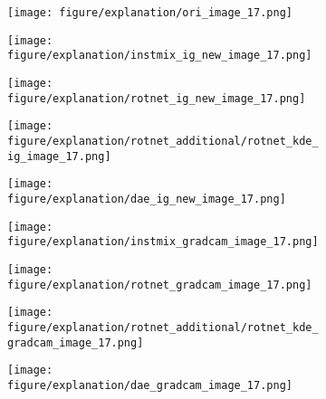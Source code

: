 \documentclass{article} \usepackage{iclr2021_conference,times}
\begin{document}
\begin{figure}[h!]
\centering
\begin{subfigure}{.11\textwidth}
  \centering
  \texttt{[image: figure/explanation/ori\_image\_17.png]}
\end{subfigure}
\hspace{-2mm}
\begin{subfigure}{.11\textwidth}
  \centering
  \texttt{[image: figure/explanation/instmix\_ig\_new\_image\_17.png]}
\end{subfigure}
\hspace{-2mm}
\begin{subfigure}{.11\textwidth}
  \centering
  \texttt{[image: figure/explanation/rotnet\_ig\_new\_image\_17.png]}
\end{subfigure}
\hspace{-2mm}
\begin{subfigure}{.11\textwidth}
  \centering
  \texttt{[image: figure/explanation/rotnet\_additional/rotnet\_kde\_ig\_image\_17.png]}
\end{subfigure}
\hspace{-2mm}
\begin{subfigure}{.11\textwidth}
  \centering
  \texttt{[image: figure/explanation/dae\_ig\_new\_image\_17.png]}
\end{subfigure}
\hspace{-2mm}
\begin{subfigure}{.11\textwidth}
  \centering
  \texttt{[image: figure/explanation/instmix\_gradcam\_image\_17.png]}
\end{subfigure}
\hspace{-2mm}
\begin{subfigure}{.11\textwidth}
  \centering
  \texttt{[image: figure/explanation/rotnet\_gradcam\_image\_17.png]}
\end{subfigure}
\hspace{-2mm}
\begin{subfigure}{.11\textwidth}
  \centering
  \texttt{[image: figure/explanation/rotnet\_additional/rotnet\_kde\_gradcam\_image\_17.png]}
\end{subfigure}
\hspace{-2mm}
\begin{subfigure}{.11\textwidth}
  \centering
  \texttt{[image: figure/explanation/dae\_gradcam\_image\_17.png]}
\end{subfigure}\\

\end{figure}
\end{document}
